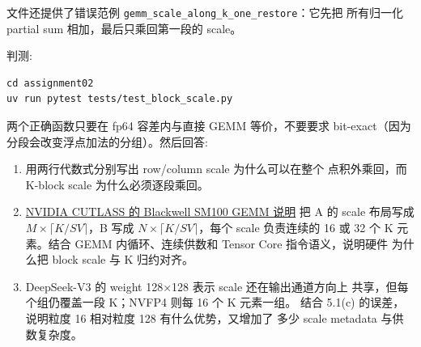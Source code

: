 \documentclass[11pt,a4paper,fontset=fandol]{ctexart}
\begin{document}
文件还提供了错误范例
\texttt{gemm\_\allowbreak{}scale\_\allowbreak{}along\_\allowbreak{}k\_\allowbreak{}one\_\allowbreak{}restore}：它先把
所有归一化 partial sum 相加，最后只乘回第一段的 scale。

判测:

\begin{verbatim}
cd assignment02
uv run pytest tests/test_block_scale.py
\end{verbatim}

两个正确函数只要在 fp64 容差内与直接 GEMM 等价，不要要求
bit-exact（因为分段会改变浮点加法的分组）。然后回答:

\begin{enumerate}
\def\labelenumi{(\alph{enumi})}
\item
  用两行代数式分别写出 row/column scale 为什么可以在整个 点积外乘回，而
  K-block scale 为什么必须逐段乘回。
\item
  \href{https://docs.nvidia.com/cutlass/latest/media/docs/cpp/blackwell_functionality.html}{NVIDIA
  CUTLASS 的 Blackwell SM100 GEMM 说明} 把 A 的 scale 布局写成
  \(M \times \lceil K/SV \rceil\)，B 写成
  \(N \times \lceil K/SV \rceil\)，每个 scale 负责连续的 16 或 32 个 K
  元素。结合 GEMM 内循环、连续供数和 Tensor Core 指令语义，说明硬件
  为什么把 block scale 与 K 归约对齐。
\item
  DeepSeek-V3 的 weight 128×128 表示 scale 还在输出通道方向上
  共享，但每个组仍覆盖一段 K；NVFP4 则每 16 个 K 元素一组。 结合 5.1(c)
  的误差，说明粒度 16 相对粒度 128 有什么优势，又增加了 多少 scale
  metadata 与供数复杂度。
\end{enumerate}
\end{document}
